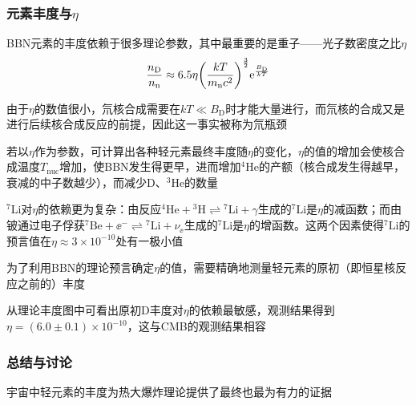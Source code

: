 \subsubsection{元素丰度与$\eta$}
\par 
BBN元素的丰度依赖于很多理论参数，其中最重要的是重子——光子数密度之比$\eta$
$$
\frac{n_{\text{D}}}{n_{\text{n}}} \approx 6.5 \eta \qty(\frac{k T}{m_{\text{n}} c^2})^{\frac{3}{2}} \mathrm{e}^{\frac{B_{\text{D}}}{k T}}
$$
\par 
由于$\eta$的数值很小，氘核合成需要在$kT \ll B_{\text{D}}$时才能大量进行，而氘核的合成又是进行后续核合成反应的前提，因此这一事实被称为氘瓶颈
\par 
若以$\eta$作为参数，可计算出各种轻元素最终丰度随$\eta$的变化，$\eta$的值的增加会使核合成温度$T_{\text{nuc}}$增加，使BBN发生得更早，进而增加${}^4\text{He}$的产额（核合成发生得越早，衰减的中子数越少），而减少D、${}^3\text{He}$的数量
\par 
${}^7\text{Li}$对$\eta$的依赖更为复杂：由反应${}^4\text{He} + {}^3\text{H} \rightleftharpoons {}^7\text{Li} + \gamma$生成的${}^7\text{Li}$是$\eta$的减函数；而由铍通过电子俘获${}^7\text{Be} + \ee^- \rightleftharpoons {}^7\text{Li} + \nu_{\ee}$生成的${}^7\text{Li}$是$\eta$的增函数。这两个因素使得${}^7\text{Li}$的预言值在$\eta \approx 3 \times 10^{-10}$处有一极小值
\par 
为了利用BBN的理论预言确定$\eta$的值，需要精确地测量轻元素的原初（即恒星核反应之前的）丰度
\par 
从理论丰度图中可看出原初D丰度对$\eta$的依赖最敏感，观测结果得到$\eta = (6.0 \pm 0.1) \times 10^{-10}$，这与CMB的观测结果相容

\subsubsection{总结与讨论}
\par 
宇宙中轻元素的丰度为热大爆炸理论提供了最终也最为有力的证据

